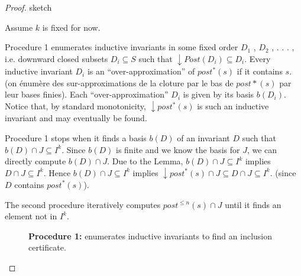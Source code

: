 \begin{proof}{sketch}


Assume $k$ is fixed for now.

Procedure 1 enumerates inductive invariants in some fixed order $D_1$ , $D_2$ , . . . , i.e. downward closed subsets $D_i \subseteq S$ such that $\downarrow Post(D_i ) \subseteq D_i$. 
Every inductive invariant $D_i$ is an “over-approximation” of $post^*(s)$ if it contains $s$.
(on énumère des sur-approximations de la cloture par le bas de $post*(s)$ par leur bases finies).
Each “over-approximation” $D_i$ is given by its basis $b(D_i)$. Notice that, by standard monotonicity, $\downarrow post^*(s)$ is such an inductive invariant and may
eventually be found.


Procedure 1 stops when it finds a basis $b(D)$ of an invariant $D$ such that
$b(D)  \cap J \subseteq I^k$.  Since $b(D)$ is finite and we know the basis for $J$, we can
directly compute $b(D)  \cap J$.
Due to the Lemma, 
$b(D)  \cap J \subseteq I^k$ implies
$D  \cap J \subseteq I^k$.
Hence
$b(D)  \cap J \subseteq I^k$ implies
$\downarrow post^*(s) \cap J \subseteq D  \cap J \subseteq I^k$.
(since $D$ contains $post^*(s)$).



The second procedure iteratively computes
$post^{\leq n}(s) \cap J$
until it finds an element
not in $ I^k$.







\begin{figure}
	\caption{\textbf{Procedure 1:} enumerates inductive invariants to find an inclusion certificate.}\label{procedure1}
\end{figure}





\end{proof}
